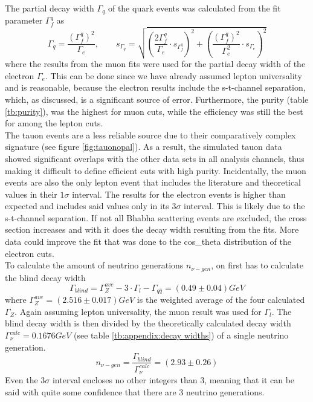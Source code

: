 The partial decay width $\Gamma_q$ of the quark events was calculated from the fit parameter $\Gamma_f^q$ as
\begin{equation}
\Gamma_q=\frac{(\Gamma_{f}^q)^2}{\Gamma_e},\qquad
s_{\Gamma_q}=\sqrt{\left(\frac{2\Gamma_f^q}{\Gamma_e}\cdot s_{\Gamma_f^q}\right)^2+\left(\frac{(\Gamma_f^q)^2}{\Gamma_e^2}\cdot s_{\Gamma_e}\right)^2}
\end{equation}
where the results from the muon fits were used for the partial decay width of the electron $\Gamma_e$. This can be done since we have already assumed lepton universality and is reasonable, because the electron results include the s-t-channel separation, which, as discussed, is a significant source of error. Furthermore, the purity (table \ref{tb:purity}), was the highest for muon cuts, while the efficiency was still the best for among the lepton cuts.\\
The tauon events are a less reliable source due to their comparatively complex signature (see figure \ref{fig:tauonopal}). As a result, the simulated tauon data showed significant overlaps with the other data sets in all analysis channels, thus making it difficult to define efficient cuts with high purity. 
Incidentally, the muon events are also the only lepton event that includes the literature and theoretical values in their $1\sigma$ interval. The results for the electron events is higher than expected and includes said values only in its $3\sigma$ interval. This is likely due to the s-t-channel separation. If not all Bhabha scattering events are excluded, the cross section increases and with it does the decay width resulting from the fits. More data could improve the fit that was done to the cos\_theta distribution of the electron cuts. \\

To calculate the amount of neutrino generations $n_{\nu-gen}$, on first has to calculate the blind decay width
\begin{equation}
	\Gamma_{blind}=\Gamma_{Z}^{ave}-3\cdot\Gamma_l-\Gamma_{q\overline{q}}=\unit{(0.49\pm0.04)}{GeV}
\end{equation}
where $\Gamma_{Z}^{ave}=\unit{(2.516\pm0.017)}{GeV}$ is the weighted average of the four calculated $\Gamma_Z$. Again assuming lepton universality, the muon result was used for $\Gamma_l$.
The blind decay width is then divided by the theoretically calculated decay width $\Gamma_{\nu}^{calc}=\unit{0.1676}{GeV}$ (see table \ref{tb:appendix:decay widths}) of a single neutrino generation.
\begin{equation}
	n_{\nu-gen}=\frac{\Gamma_{blind}}{\Gamma_{\nu}^{calc}}=(2.93\pm0.26)
\end{equation}
Even the $3\sigma$ interval encloses no other integers than 3, meaning that it can be said with quite some confidence that there are 3 neutrino generations.


